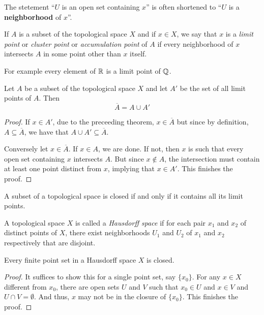 The stetement ``$U$ is an open set containing $x$'' is often shortened to ``$U$ is a \textbf{neighborhood} of $x$''.

\begin{definition}
    If $A$ is a subset of the topological space $X$ and if $x\in X$, we say that $x$ is a \textit{limit point} or \textit{cluster point} or \textit{accumulation point} of $A$ if every neighborhood of $x$ intersects $A$ in some point other than $x$ itself.
\end{definition}
For example every element of $\mathbb{R}$ is a limit point of $\mathbb{Q}$.

\begin{theorem}
    Let $A$ be a subset of the topological space $X$ and let $A'$ be the set of all limit points of $A$. Then 
    \begin{equation*}
        \overline{A} = A\cup A'
    \end{equation*}
\end{theorem}
\begin{proof}
    If $x\in A'$, due to the preceeding theorem, $x\in\overline{A}$ but since by definition, $A\subseteq\overline{A}$, we have that $A\cup A'\subseteq\overline{A}$.

    Conversely let $x\in\overline{A}$. If $x\in A$, we are done. If not, then $x$ is such that every open set containing $x$ intersects $A$. But since $x\notin A$, the intersection must contain at least one point distinct from $x$, implying that $x\in A'$. This finishes the proof.
\end{proof}
\begin{corollary}
    A subset of a topological space is closed if and only if it contains all its limit points.
\end{corollary}

\begin{definition}
    A topological space $X$ is called a \textit{Hausdorff space} if for each pair $x_1$ and $x_2$ of distinct points of $X$, there exist neighborhoods $U_1$ and $U_2$ of $x_1$ and $x_2$ respectively that are disjoint.
\end{definition}

\begin{theorem}
    Every finite point set in a Hausdorff space $X$ is closed.
\end{theorem}
\begin{proof}
    It suffices to show this for a single point set, say $\{x_0\}$. For any $x\in X$ different from $x_0$, there are open sets $U$ and $V$ such that $x_0\in U$ and $x\in V$ and $U\cap V=\emptyset$. And thus, $x$ may not be in the closure of $\{x_0\}$. This finishes the proof.
\end{proof}

